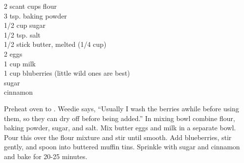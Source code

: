 \begin{ingredients}
2 scant cups flour\\
3 tsp. baking powder\\
1/2 cup sugar\\
1/2 tsp. salt\\
1/2 stick butter, melted (1/4 cup)\\
2 eggs\\
1 cup milk\\
1 cup bluberries (little wild ones are best)\\
sugar\\
cinnamon
\end{ingredients}
Preheat oven to . Weedie says, ``Usually I wash the berries awhile
before using them, so they can dry off before being added.'' In mixing bowl
combine flour, baking powder, sugar, and salt. Mix butter eggs and milk in a
separate bowl. Pour this over the flour mixture and stir until smooth. Add
blueberries, stir gently, and spoon into buttered muffin tins. Sprinkle with
sugar and cinnamon and bake for 20-25 minutes.
